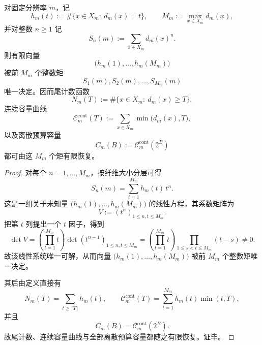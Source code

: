 \begin{theorem}[有限矩谱的严格决定性与容量曲线的有限截断恢复]\label{thm:conclusion-finite-moment-spectrum-strict-determinacy-truncation}
对固定分辨率 \(m\)，记
\[
h_m(t):=\#\{x\in X_m:\ d_m(x)=t\},
\qquad
M_m:=\max_{x\in X_m}d_m(x),
\]
并对整数 \(n\ge 1\) 记
\[
S_n(m):=\sum_{x\in X_m}d_m(x)^n.
\]
则有限向量
\[
\bigl(h_m(1),\dots,h_m(M_m)\bigr)
\]
被前 \(M_m\) 个整数矩
\[
S_1(m),S_2(m),\dots,S_{M_m}(m)
\]
唯一决定。因而尾计数函数
\[
N_m(T):=\#\{x\in X_m:\ d_m(x)\ge T\},
\]
连续容量曲线
\[
\mathcal C_m^{\mathrm{cont}}(T):=\sum_{x\in X_m}\min\bigl(d_m(x),T\bigr),
\]
以及离散预算容量
\[
C_m(B):=\mathcal C_m^{\mathrm{cont}}(2^B)
\]
都可由这 \(M_m\) 个矩有限恢复。
\end{theorem}
\begin{proof}
对每个 \(n=1,\dots,M_m\)，按纤维大小分层可得
\[
S_n(m)=\sum_{t=1}^{M_m} h_m(t)\,t^n.
\]
这是一组关于未知量 \(\bigl(h_m(1),\dots,h_m(M_m)\bigr)\) 的线性方程，其系数矩阵为
\[
V:=(t^n)_{1\le n,t\le M_m}.
\]
把第 \(t\) 列提出一个 \(t\) 因子，得到
\[
\det V
=
\left(\prod_{t=1}^{M_m}t\right)
\det(t^{n-1})_{1\le n,t\le M_m}
=
\left(\prod_{t=1}^{M_m}t\right)
\prod_{1\le s<t\le M_m}(t-s)\neq 0.
\]
故该线性系统唯一可解，从而向量 \(\bigl(h_m(1),\dots,h_m(M_m)\bigr)\) 被前 \(M_m\) 个整数矩唯一决定。

其后由定义直接有
\[
N_m(T)=\sum_{t\ge \lceil T\rceil}h_m(t),
\qquad
\mathcal C_m^{\mathrm{cont}}(T)=\sum_{t=1}^{M_m}h_m(t)\min(t,T),
\]
并且
\[
C_m(B)=\mathcal C_m^{\mathrm{cont}}(2^B).
\]
故尾计数、连续容量曲线与全部离散预算容量都随之有限恢复。证毕。
\end{proof}


